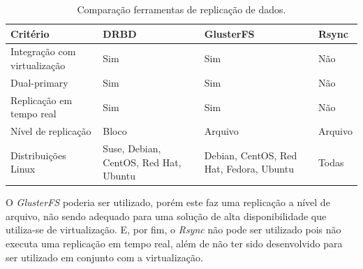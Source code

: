 \begin{table}[h!]
\caption{Comparação ferramentas de replicação de dados.}
\label{tab:replicacao}
\begin{center}
\begin{tabular}{|l|p{3.5cm}|p{3.5cm}|p{2cm}|}\hline
\textbf{Critério} & \textbf{DRBD} & \textbf{GlusterFS} & \textbf{Rsync} \\\hline
Integração com virtualização & Sim & Sim & Não \\\hline
Dual-primary & Sim & Sim & Não \\\hline
Replicação em tempo real & Sim & Sim & Não \\\hline
Nível de replicação & Bloco & Arquivo & Arquivo \\\hline
Distribuições Linux & Suse, Debian, CentOS, Red Hat, Ubuntu & Debian, CentOS, Red Hat, Fedora, Ubuntu & Todas \\\hline
\end{tabular}
\end{center}
\end{table}

O \textit{GlusterFS} poderia ser utilizado, porém este faz uma replicação a nível de arquivo, não sendo adequado para uma solução de alta 
disponibilidade que utiliza-se de virtualização. E, por fim, o \textit{Rsync} não pode ser utilizado pois não executa uma replicação em tempo real, 
além de não ter sido desenvolvido para ser utilizado em conjunto com a virtualização.





